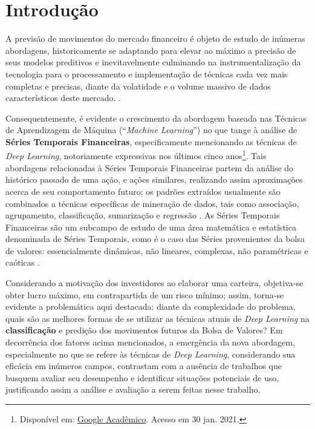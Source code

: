 \chapter{Introdução}

\setcounter{page}{11}

\par
A previsão de movimentos do mercado financeiro é objeto de estudo de inúmeras abordagens, historicamente se adaptando para elevar ao máximo a precisão de seus modelos preditivos e inevitavelmente culminando na instrumentalização da tecnologia para o processamento e implementação de técnicas cada vez mais completas e precisas, diante da volatidade e o volume massivo de dados característicos deste mercado. \cite{senDattaChau2015}.

\par
Consequentemente, é evidente o crescimento da abordagem baseada nas Técnicas de Aprendizagem de Máquina (“\textit{Machine Learning}”) no que tange à análise de \textbf{Séries Temporais Financeiras}, especificamente mencionando as técnicas de \textit{Deep Learning}, notoriamente expressivas nos últimos cinco anos\footnote[1]{Disponível em: \href{https://scholar.google.com.br/scholar?q=\%22CNN\%22+\%22LSTM\%22+\%22bolsa+de+valores\%22\&hl=pt-BR\&as\_sdt=0\%2C5\&as\_ylo=2000\&as\_yhi=2021}{Google Acadêmico}. Acesso em 30 jan. 2021.}. Tais abordagens relacionadas à Séries Temporais Financeiras partem da análise do histórico passado de uma ação, e ações similares, realizando assim aproximações acerca de seu comportamento futuro; os padrões extraídos usualmente são combinados a técnicas específicas de mineração de dados, tais como associação, agrupamento, classificação, sumarização e regressão \cite{fu2011}. As Séries Temporais Financeiras são um subcampo de estudo de uma área matemática e estatística denominada de Séries Temporais, como é o caso das Séries provenientes da bolsa de valores: essencialmente dinâmicas, não lineares, complexas, não paramétricas e caóticas \cite{abuMostafaAtiya96}.

\par
Considerando a motivação dos investidores ao elaborar uma carteira, objetiva-se obter lucro máximo, em contrapartida de um risco mínimo; assim, torna-se evidente a problemática aqui destacada: diante da complexidade do problema, quais são as melhores formas de se utilizar as técnicas atuais de \textit{Deep Learning} na \textbf{classificação} e predição dos movimentos futuros da Bolsa de Valores? Em decorrência dos fatores acima mencionados, a emergência da nova abordagem, especialmente no que se refere às técnicas de \textit{Deep Learning}, considerando sua eficácia em inúmeros campos, contrastam com a ausência de trabalhos que busquem avaliar seu desempenho e identificar situações potenciais de uso, justificando assim a análise e avaliação a serem feitas nesse trabalho.